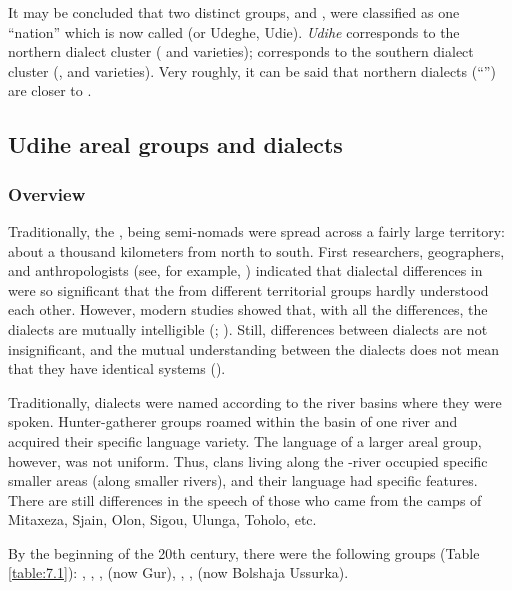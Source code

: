 \documentclass[output=paper,colorlinks,citecolor=brown]{langscibook}
\begin{document}
It may be concluded that two distinct groups,  and , were classified as one “nation” which is now called  (or Udeghe, Udie). \textit{Udihe} corresponds to the northern dialect cluster ( and  varieties); \textit{} corresponds to the southern dialect cluster (,  and  varieties). Very roughly, it can be said that northern dialects (“”) are closer to .


\subsection{Udihe areal groups and dialects}

\subsubsection{Overview}

Traditionally, the , being semi-nomads were spread across a fairly large territory: about a thousand kilometers from north to south. First researchers, geographers, and anthropologists (see, for example, \citealt[V, 81]{Arseniev1947}) indicated that dialectal differences in  were so significant that the  from different territorial groups hardly understood each other. However, modern studies showed that, with all the differences, the  dialects are mutually intelligible (\citealt{Simonov1988}; \citealt{Perekhvalskaya2010}). Still, differences between  dialects are not insignificant, and the mutual understanding between the dialects does not mean that they have identical systems (\citealt[21--23]{Trudgill1985}).

Traditionally,  dialects were named according to the river basins where they were spoken. Hunter-gatherer groups roamed within the basin of one river and acquired their specific language variety. The language of a larger areal group, however, was not uniform. Thus,  clans living along the -river occupied specific smaller areas (along smaller rivers), and their language had specific features. There are still differences in the speech of those who came from the camps of Mitaxeza, Sjain, Olon, Sigou, Ulunga, Toholo, etc.

By the beginning of the 20th century, there were the following  groups (Table \ref{table:7.1}): , , ,  (now Gur), , ,  (now Bolshaja Ussurka).
\end{document}

